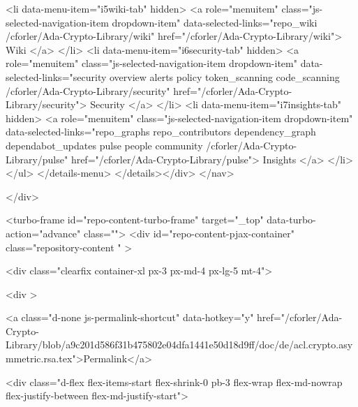               <li data-menu-item="i5wiki-tab" hidden>
                <a role="menuitem" class="js-selected-navigation-item dropdown-item" data-selected-links="repo_wiki /cforler/Ada-Crypto-Library/wiki" href="/cforler/Ada-Crypto-Library/wiki">
                  Wiki
</a>              </li>
              <li data-menu-item="i6security-tab" hidden>
                <a role="menuitem" class="js-selected-navigation-item dropdown-item" data-selected-links="security overview alerts policy token_scanning code_scanning /cforler/Ada-Crypto-Library/security" href="/cforler/Ada-Crypto-Library/security">
                  Security
</a>              </li>
              <li data-menu-item="i7insights-tab" hidden>
                <a role="menuitem" class="js-selected-navigation-item dropdown-item" data-selected-links="repo_graphs repo_contributors dependency_graph dependabot_updates pulse people community /cforler/Ada-Crypto-Library/pulse" href="/cforler/Ada-Crypto-Library/pulse">
                  Insights
</a>              </li>
          </ul>
</details-menu>
</details></div>
</nav>

  </div>

  



<turbo-frame id="repo-content-turbo-frame" target="_top" data-turbo-action="advance" class="">
    <div id="repo-content-pjax-container" class="repository-content " >
    


    
      
  <div class="clearfix container-xl px-3 px-md-4 px-lg-5 mt-4">
    
    
<div >
  

  



    
<a class="d-none js-permalink-shortcut" data-hotkey="y" href="/cforler/Ada-Crypto-Library/blob/a9c201d586f31b475802e04dfa1441e50d18d9ff/doc/de/acl.crypto.asymmetric.rsa.tex">Permalink</a>

<div class="d-flex flex-items-start flex-shrink-0 pb-3 flex-wrap flex-md-nowrap flex-justify-between flex-md-justify-start">
  
